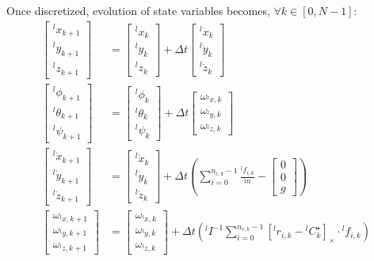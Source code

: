 \documentclass[a4paper,11pt]{article}
\begin{document}
Once discretized, evolution of state variables becomes, $\forall k \in [0, N-1]$:
\begin{align}
\begin{bmatrix} {}^l\! x_{k+1} \\ {}^l\! y_{k+1} \\ {}^l\! z_{k+1} \end{bmatrix} &= \begin{bmatrix} {}^l\! x_{k} \\ {}^l\! y_{k} \\ {}^l\! z_{k} \end{bmatrix} + \Delta t \begin{bmatrix} {}^l\! \dot x_{k} \\ {}^l\! \dot y_{k} \\ {}^l\! \dot z_{k} \end{bmatrix} \\
\begin{bmatrix} {}^l\! \phi_{k+1} \\ {}^l\! \theta_{k+1} \\ {}^l\! \psi_{k+1} \end{bmatrix} &= \begin{bmatrix} {}^l\! \phi_{k} \\ {}^l\! \theta_{k} \\ {}^l\! \psi_{k} \end{bmatrix} + \Delta t \begin{bmatrix}  \omega_{{}^l\!x,k} \\  \omega_{{}^l\!y,k} \\ \omega_{{}^l\! z,k} \end{bmatrix} \\
\begin{bmatrix} {}^l\! \dot x_{k+1} \\ {}^l\! \dot y_{k+1} \\ {}^l\! \dot z_{k+1} \end{bmatrix} &= \begin{bmatrix} {}^l\! \dot x_{k} \\ {}^l\! \dot y_{k} \\ {}^l\! \dot z_{k} \end{bmatrix} + \Delta t \left( \sum_{i=0}^{n_{c,k} - 1} \frac{{}^l\!f_{i,k}}{m} - \begin{bmatrix} 0 \\ 0 \\ g \end{bmatrix}  \right) \\
\begin{bmatrix} \omega_{{}^l\!x,k+1} \\  \omega_{{}^l\!y,k+1} \\ \omega_{{}^l\! z,k+1} \end{bmatrix} &= \begin{bmatrix}  \omega_{{}^l\!x,k} \\  \omega_{{}^l\!y,k} \\ \omega_{{}^l\! z,k} \end{bmatrix} + \Delta t \left( {}^l\!I^{-1}\sum_{i=0}^{n_{c,k} - 1} [{}^l\!r_{i,k} - {}^l\!C_{k}^\star]_\times \cdot {}^l\!f_{i,k}   \right)
\end{align}
\end{document}

